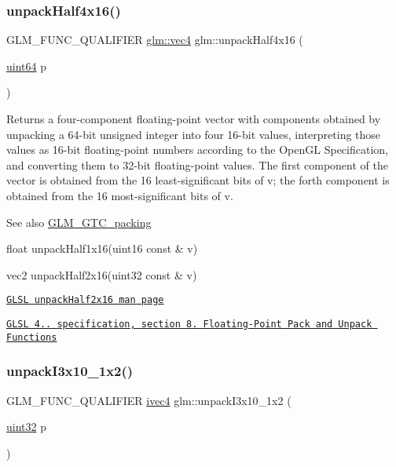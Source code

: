 \subsubsection{\texorpdfstring{unpack\+Half4x16()}{unpackHalf4x16()}}
{\footnotesize\ttfamily G\+L\+M\+\_\+\+F\+U\+N\+C\+\_\+\+Q\+U\+A\+L\+I\+F\+I\+ER \hyperlink{group__core__types_ga5881b1b022d7fd1b7218f5916532dd02}{glm\+::vec4} glm\+::unpack\+Half4x16 (\begin{DoxyParamCaption}\item[{\hyperlink{group__gtc__type__precision_gae3632bf9b37da66233d78930dd06378a}{uint64}}]{p }\end{DoxyParamCaption})}

Returns a four-\/component floating-\/point vector with components obtained by unpacking a 64-\/bit unsigned integer into four 16-\/bit values, interpreting those values as 16-\/bit floating-\/point numbers according to the Open\+GL Specification, and converting them to 32-\/bit floating-\/point values. The first component of the vector is obtained from the 16 least-\/significant bits of v; the forth component is obtained from the 16 most-\/significant bits of v.

\begin{DoxySeeAlso}{See also}
\hyperlink{group__gtc__packing}{G\+L\+M\+\_\+\+G\+T\+C\+\_\+packing} 

float unpack\+Half1x16(uint16 const \& v) 

vec2 unpack\+Half2x16(uint32 const \& v) 

\href{http://www.opengl.org/sdk/docs/manglsl/xhtml/unpackHalf2x16.xml}{\tt G\+L\+SL unpack\+Half2x16 man page} 

\href{http://www.opengl.org/registry/doc/GLSLangSpec.4.20.8.pdf}{\tt G\+L\+SL 4.. specification, section 8. Floating-\/\+Point Pack and Unpack Functions} 
\end{DoxySeeAlso}
\mbox{\label{group__gtc__packing_ga08bcd34cf9c34701d658dd861ee6e300}} 
\subsubsection{\texorpdfstring{unpack\+I3x10\+\_\+1x2()}{unpackI3x10\_1x2()}}
{\footnotesize\ttfamily G\+L\+M\+\_\+\+F\+U\+N\+C\+\_\+\+Q\+U\+A\+L\+I\+F\+I\+ER \hyperlink{group__core__types_gaa4560ddc50320ea8f8a70d5c9c249fea}{ivec4} glm\+::unpack\+I3x10\+\_\+1x2 (\begin{DoxyParamCaption}\item[{\hyperlink{group__gtc__type__precision_ga202b6a53c105fcb7e531f9b443518451}{uint32}}]{p }\end{DoxyParamCaption})}

